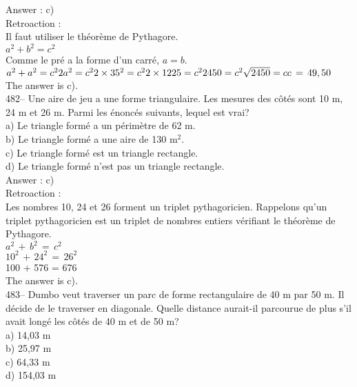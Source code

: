 ﻿\documentclass[letterpaper, 12pt]{article}
\begin{document}
Answer :  c)\\

Retroaction : \\
Il faut utiliser le th\'eor\`eme de Pythagore.  \\
$a^{2}+b^{2}=c^{2}$\\
Comme le pr\'e a la forme d'un carr\'e, $a=b.$\\
$a^{2}+a^{2}=c^{2}\\
2a^{2}=c^{2}\\
2\times35^{2}=c^{2}\\
2\times 1225=c^{2}\\
2450=c^{2}\\
\sqrt{2450}=c\\
c\,=\,49,50$\\
The answer is c).\\


482-- Une aire de jeu a une forme triangulaire.  Les mesures des
c\^ot\'es sont 10 m, 24 m et 26 m.  Parmi les \'enonc\'es suivants,
lequel est vrai?\\
a) Le triangle form\'e a un p\'erim\`etre de 62 m.\\
b) Le triangle form\'e a une aire de 130 m$^{2}$.\\
c) Le triangle form\'e est un triangle rectangle.\\
d) Le triangle form\'e n'est pas un triangle rectangle.\\

Answer :  c)\\

Retroaction : \\
Les nombres 10, 24 et 26 forment un triplet pythagoricien.  Rappelons qu'un
triplet pythagoricien est un triplet de nombres entiers v\'erifiant le
th\'eor\`eme de Pythagore.\\
$a^{2}\,+\,b^{2}\,=\,c^{2}$\\
$10^{2}\,+\,24^{2}\,=\,26^{2}$\\
100 + 576 = 676\\
The answer is c).\\

483-- Dumbo veut traverser un parc de forme rectangulaire de 40 m par 50 m.
Il d\'ecide de le traverser en diagonale.  Quelle distance aurait-il
parcourue de plus s'il avait long\'e les c\^ot\'es de 40 m et de 50 m?\\
a) 14,03 m\\
b) 25,97 m\\
c) 64,33 m\\
d) 154,03 m\\
\end{document}

